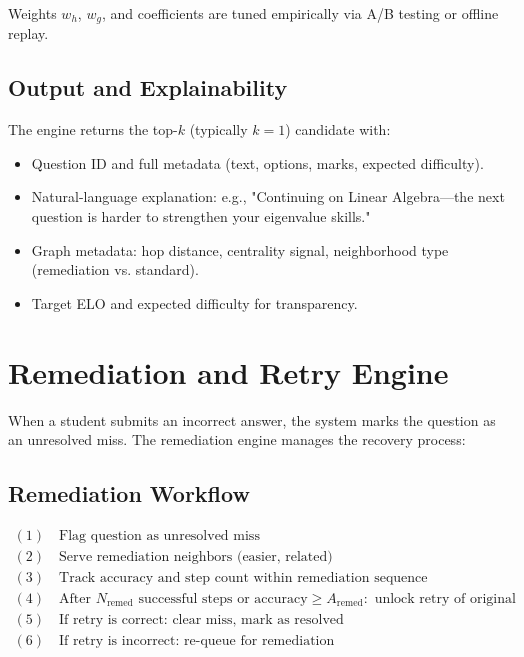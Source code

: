 \documentclass[sigconf,authordraft,twoside]{acmart}
\begin{document}
Weights $w_h$, $w_g$, and coefficients are tuned empirically via A/B testing or offline replay.

\subsection{Output and Explainability}

The engine returns the top-$k$ (typically $k=1$) candidate with:

\begin{itemize}
\item Question ID and full metadata (text, options, marks, expected difficulty).
\item Natural-language explanation: e.g., "Continuing on Linear Algebra---the next question is harder to strengthen your eigenvalue skills."
\item Graph metadata: hop distance, centrality signal, neighborhood type (remediation vs. standard).
\item Target ELO and expected difficulty for transparency.
\end{itemize}

\section{Remediation and Retry Engine}

When a student submits an incorrect answer, the system marks the question as an unresolved miss. The remediation engine manages the recovery process:

\subsection{Remediation Workflow}

\begin{equation}
\boxed{\begin{array}{l}
(1) \quad \text{Flag question as unresolved miss} \\
(2) \quad \text{Serve remediation neighbors (easier, related)} \\
(3) \quad \text{Track accuracy and step count within remediation sequence} \\
(4) \quad \text{After } N_{\text{remed}} \text{ successful steps or accuracy} \geq A_{\text{remed}}: \text{ unlock retry of original} \\
(5) \quad \text{If retry is correct: clear miss, mark as resolved} \\
(6) \quad \text{If retry is incorrect: re-queue for remediation}
\end{array}}
\end{equation}
\end{document}
